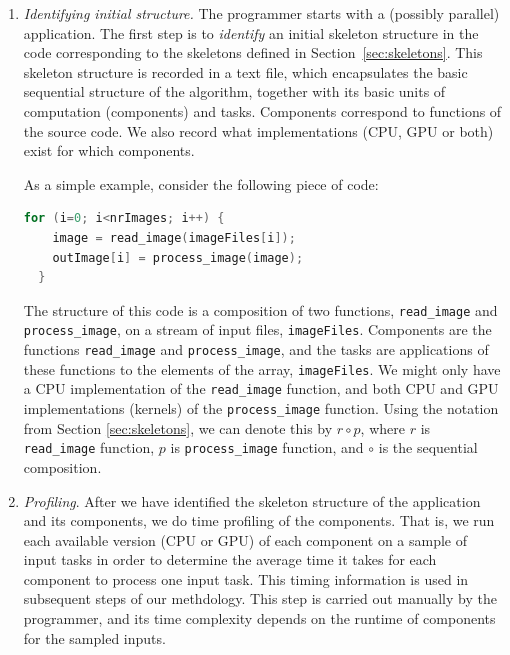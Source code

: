 \documentclass[smallextended]{svjour3}
\begin{document}
\begin{enumerate}
\item \emph{Identifying initial structure.} The programmer starts with a (possibly parallel) application. The first step is to \emph{identify}
 an initial
  skeleton structure in the code corresponding to the skeletons defined in Section~\ref{sec:skeletons}.
  This skeleton structure is recorded in a text file, which encapsulates the basic sequential structure of the
  algorithm, together with its basic units of computation (components) and
  tasks. Components correspond to functions of the source code. 
  We also record what implementations (CPU, GPU or both) exist
  for which components. 

  As a simple example, consider the
  following piece of code:
  \begin{lstlisting}[language=C]
  for (i=0; i<nrImages; i++) {
    image = read_image(imageFiles[i]);
    outImage[i] = process_image(image);
  }
   \end{lstlisting}
  The structure of this code is a composition of two functions,
  \lstinline|read_image| and \lstinline|process_image|, on a stream of
  input files, \lstinline|imageFiles|. Components are the
  functions \lstinline|read_image| and \lstinline|process_image|, and the
  tasks are applications of these functions to the elements of the array,
  \lstinline|imageFiles|. We might only have a CPU implementation of
  the \lstinline|read_image| function, and both CPU and GPU implementations (kernels)
  of the \lstinline|process_image| function.
  Using the notation from Section
  \ref{sec:skeletons}, we can denote this by $r \circ p$, where $r$ is 
  \lstinline{read_image} function, $p$ is
  \lstinline|process_image| function, and $\circ$ is the sequential
  composition. 


\item \emph{Profiling}. After we have identified the skeleton
  structure of the application and its components, we do time
  profiling of the components. That is, we run each available version (CPU or
  GPU) of each component on a sample of input tasks in order to determine
  the average time it takes for each component to process one input
  task. This timing information is used in subsequent  steps of our
  methdology. This step is carried out manually by the programmer, and
  its time complexity depends on the runtime of components for the
  sampled inputs.


\end{enumerate}
\end{document}
